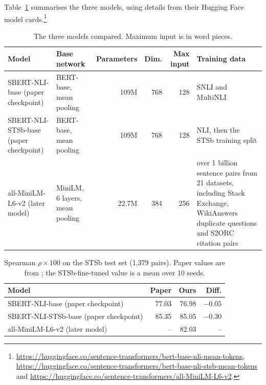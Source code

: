 \documentclass[11pt]{article}
\begin{document}
Table~\ref{tab:models} summarises the three models, using details from their Hugging Face model cards.\footnote{\url{https://huggingface.co/sentence-transformers/bert-base-nli-mean-tokens}, \url{https://huggingface.co/sentence-transformers/bert-base-nli-stsb-mean-tokens} and \url{https://huggingface.co/sentence-transformers/all-MiniLM-L6-v2}.}

\begin{table}[t]
\centering\small\setlength{\tabcolsep}{4pt}
\begin{tabular}{p{3.3cm}p{3.0cm}rrrp{3.8cm}}
\toprule
Model & Base network & Parameters & Dim. & Max input & Training data \\
\midrule
SBERT-NLI-base (paper checkpoint) & BERT-base, mean pooling & 109M & 768 & 128 & SNLI and MultiNLI \\
SBERT-NLI-STSb-base (paper checkpoint) & BERT-base, mean pooling & 109M & 768 & 128 & NLI, then the STSb training split \\
all-MiniLM-L6-v2 (later model) & MiniLM, 6 layers, mean pooling & 22.7M & 384 & 256 & over 1 billion sentence pairs from 21 datasets, including Stack Exchange, WikiAnswers duplicate questions and S2ORC citation pairs \\
\bottomrule
\end{tabular}
\caption{The three models compared. Maximum input is in word pieces.}
\label{tab:models}
\end{table}

\begin{table}[t]
\centering\small
\begin{tabular}{p{3.6cm}rrr}
\toprule
Model & Paper & Ours & Diff. \\
\midrule
SBERT-NLI-base (paper checkpoint) & 77.03 & 76.98 & $-0.05$ \\
SBERT-NLI-STSb-base (paper checkpoint) & 85.35 & 85.05 & $-0.30$ \\
all-MiniLM-L6-v2 (later model) & -- & 82.03 & -- \\
\bottomrule
\end{tabular}
\caption{Spearman $\rho \times 100$ on the STSb test set (1,379 pairs). Paper values are from \citet{reimers2019sentence}; the STSb-fine-tuned value is a mean over 10 seeds.}
\label{tab:repl}
\end{table}
\end{document}
